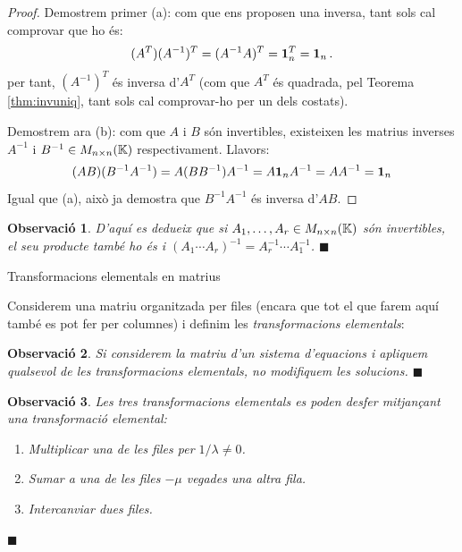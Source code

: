 \documentclass[
  11pt,
]{book}
\makeatletter
\numberwithin{dummy}{section}
\theoremstyle{maincolornumbox}
\newtheorem{remarkT}{Observació}[chapter]
\theoremstyle{blacknumex}
\theoremstyle{blacknumbox}
\theoremstyle{maincolornum}
\newenvironment{remark}{\begin{remarkT}}{\hfill{\tiny\ensuremath{\blacksquare}}\end{remarkT}}
\renewcommand{\section}{\@startsection{section}{1}{\z@}
{-4ex \@plus -1ex \@minus -.4ex}
{1ex \@plus.2ex }
{\normalfont\large\sffamily\bfseries}}
\newlength\esp
\makeatother
\begin{document}
\begin{proof}
Demostrem primer (a): com que ens proposen una inversa, tant
sols cal comprovar que ho és:
\[(A^T)(A^{-1})^T=(A^{-1}A)^T=\mathbf{1}_n^T=\mathbf{1}_n \,.\] per tant, \((A^{-1})^T\)
és inversa d'\(A^T\) (com que \(A^T\) és quadrada, pel Teorema
\ref{thm:invuniq}, tant sols cal comprovar-ho per un dels
costats).

Demostrem ara (b): com que \(A\) i \(B\) són invertibles, existeixen les
matrius inverses \(A^{-1}\) i \(B^{-1}\in M_{n\times n}(\mathbb{K})\)
respectivament. Llavors:
\[(AB)(B^{-1}A^{-1})=A(BB^{-1})A^{-1}=A\mathbf{1}_n A^{-1}=A A^{-1}=\mathbf{1}_n\] Igual
que (a), això ja demostra que \(B^{-1}A^{-1}\) és inversa d'\(AB\).
\end{proof}

\begin{remark}
D'aquí es dedueix que si \(A_1, \dots, A_r \in M_{n\times n}(\mathbb{K})\) són
invertibles, el seu producte també ho és i
\((A_1\cdots A_r)^{-1}=A_r^{-1}\cdots A_1^{-1}\).
\end{remark}

\hypertarget{subsec:trans-el}{%
\section{Transformacions elementals en matrius}\label{subsec:trans-el}}

Considerem una matriu organitzada per files (encara que tot el que farem
aquí també es pot fer per columnes) i definim les \emph{transformacions
elementals}:

\begin{remark}
Si considerem la matriu d'un sistema d'equacions i apliquem qualsevol de
les transformacions elementals, no modifiquem les solucions.
\end{remark}

\begin{remark}

Les tres transformacions elementals es poden desfer mitjançant una
transformació elemental:

\begin{enumerate}
\def\labelenumi{\arabic{enumi}.}
\item
  Multiplicar una de les files per \(1/\lambda\neq 0\).
\item
  Sumar a una de les files \(-\mu\) vegades una altra fila.
\item
  Intercanviar dues files.
\end{enumerate}

\end{remark}
\end{document}
